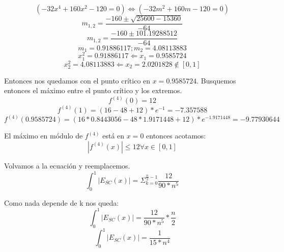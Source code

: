 \documentclass[a4paper,10pt]{article}
\begin{document}
\begin{equation}
	(-32x^4 + 160x^2 - 120 = 0) \Leftrightarrow (-32m^2 + 160m - 120 = 0)
\end{equation}
\begin{equation}
	m_{1,2} = \frac{-160 \pm \sqrt{25600 - 15360}}{-64}
\end{equation}
\begin{equation}
	m_{1,2} = \frac{-160 \pm 101.19288512}{-64}
\end{equation}
\begin{equation}
	m_1 = 0.91886117 ; m_2 = 4.08113883
\end{equation}
\begin{equation}
	x_1^2 = 0.91886117 \Leftarrow x_1 = 0.9585724
\end{equation}
\begin{equation}
	x_2^2 = 4.08113883 \Leftarrow x_2 = 2.0201828 \notin [0,1]
\end{equation}
\par Entonces nos quedamos con el punto crítico en $x=0.9585724$. Busquemos entonces el máximo entre el punto crítico y los extremos.
\begin{equation}
	f^{(4)}(0) = 12
\end{equation}
\begin{equation}
	f^{(4)}(1) = (16 - 48 + 12)*e^{-1} = -7.357588
\end{equation}
\begin{equation}
	f^{(4)}(0.9585724) = (16*0.8443056 - 48*1.9171448 + 12)*e^{-1.9171448} = -9.77930644
\end{equation}
\par El máximo en módulo de $f^{(4)}$ está en $x=0$ entonces acotamos:
\begin{equation}
	|f^{(4)}(x)| \leq 12 \forall x \in [0,1]
\end{equation}
\par Volvamos a la ecuación y reemplacemos.
\begin{equation}
	\int_0^1 \left| E_{SC}(x) \right| = \Sigma_{k=0}^{\frac{n}{2}-1} \frac{12}{90*n^5}
\end{equation}
\par Como nada depende de k nos queda:
\begin{equation}
	\int_0^1 \left| E_{SC}(x) \right| = \frac{12}{90*n^5} * \frac{n}{2}
\end{equation}
\begin{equation}
	\int_0^1 \left| E_{SC}(x) \right| = \frac{1}{15*n^4}
\end{equation}
\end{document}
